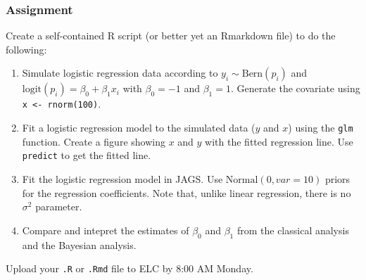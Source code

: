 \documentclass[color=usenames,dvipsnames]{beamer}\usepackage[]{graphicx}\usepackage[]{xcolor}
\newcommand{\inr}[1]{\colorbox{inlinecolor}{\texttt{#1}}}
\begin{document}
\begin{frame}
  \frametitle{Assignment}
  \small
  Create a self-contained R script (or better yet an Rmarkdown file)
  to do the following:
  \begin{enumerate}
    \small
    \item Simulate logistic regression data according to
      $y_i \sim \mathrm{Bern}(p_i)$ and $\mathrm{logit}(p_i) = \beta_0
      + \beta_1 x_i$ with $\beta_0=-1$ and $\beta_1=1$. Generate the
      covariate using \inr{x <- rnorm(100)}.
    \item Fit a logistic regression model to the simulated data ($y$
      and $x$) using the \inr{glm} function. Create a figure showing
      $x$ and $y$ with the fitted regression line. Use
      \inr{predict} to get the fitted line.
    \item Fit the logistic regression model in JAGS. Use
      $\mathrm{Normal}(0, var=10)$ priors for the regression
      coefficients. Note that, unlike linear regression, there is no
      $\sigma^2$ parameter.
    \item Compare and intepret the estimates of $\beta_0$ and
      $\beta_1$ from the classical analysis and the Bayesian analysis.
  \end{enumerate}
  Upload your {\tt .R} or {\tt .Rmd} file to ELC by 8:00 AM Monday.
\end{frame}
\end{document}
